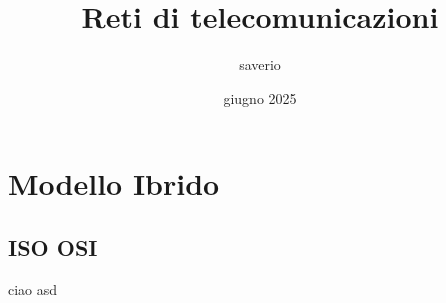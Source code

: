 \documentclass{report}
\title{Reti di telecomunicazioni}
\author{saverio}
\date{giugno 2025}
\begin{document}
\maketitle
\tableofcontents


\chapter{Modello Ibrido}
\section{ISO OSI}
ciao asd
\end{document}
